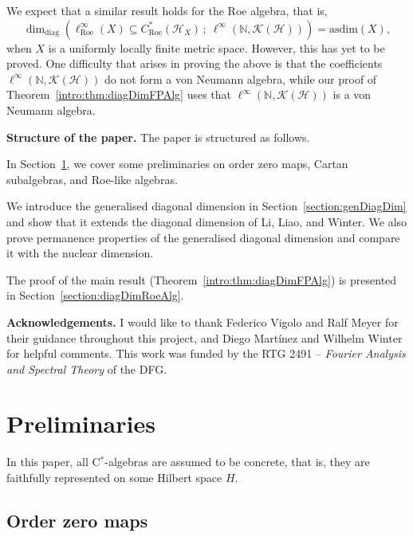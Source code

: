 \documentclass[a4paper]{amsart}
\newcommand{\myhyp}{\textnormal{-}\hskip0pt\relax}
\newcommand{\mydhyp}{\textnormal{--}\hskip0pt\relax}
\numberwithin{equation}{section}
\newcommand{\N}{\mathbb{N}}
\newcommand{\Hcal}{\mathcal{H}}
\newcommand{\Kcal}{\mathcal{K}}
\newcommand{\cstar}{C$^\ast$\myhyp{}algebra}
\newcommand{\kop}[1]{\Kcal({#1})}
\newcommand{\Croe}[1]{C^{\ast}_{\mathrm{Roe}}(#1)}
\newcommand{\CroeCartan}[1]{\ell^{\infty}_{\mathrm{Roe}}({#1})}
\newcommand{\ddimn}[3]{\dim_{\mathrm{diag}}({#1}\subseteq{#2}\, ;~{#3})}
\newcommand{\asdim}[1]{\mathrm{asdim}({#1})}
\theoremstyle{plain}
\theoremstyle{indented}
\numberwithin{equation}{section}
\theoremstyle{definition}
\theoremstyle{remark}
\theoremstyle{plain}
\theoremstyle{definition}
\begin{document}
\medskip

We expect that a similar result holds for the Roe algebra,
that is, 
\begin{equation*}
         \ddimn{\CroeCartan{X}}{\Croe{\Hcal_X}}{\ell^\infty(\N, \kop{\Hcal})} = \asdim{X},
\end{equation*}
when $X$ is a uniformly locally finite metric space.
However, this has yet to be proved.
One difficulty that arises in proving the above is that the coefficients
${\ell^\infty(\N, \kop{\Hcal})}$ do not form a von Neumann algebra,
while our proof of Theorem~\ref{intro:thm:diagDimFPAlg} uses that ${\ell^\infty(\N, \kop{\Hcal})}$ is a von Neumann algebra.




\bigskip
\noindent\textbf{Structure of the paper.}
The paper is structured as follows. 

In Section~\ref{section:prelim}, we cover some preliminaries on order zero maps, Cartan subalgebras, and Roe-like algebras.

We introduce the generalised diagonal dimension in Section~\ref{section:genDiagDim} and show that it extends the diagonal dimension of Li, Liao, and Winter. We also prove permanence properties of the generalised diagonal dimension and compare it with the nuclear dimension. 

The proof of the main result (Theorem~\ref{intro:thm:diagDimFPAlg}) is presented in Section~\ref{section:diagDimRoeAlg}.



\bigskip
\noindent\textbf{Acknowledgements.}
I would like to thank Federico Vigolo and Ralf Meyer for their guidance throughout this project, and Diego Mart\'{i}nez and Wilhelm Winter for helpful comments.
This work was funded by the RTG 2491 \mydhyp{} \emph{Fourier Analysis and Spectral Theory} of the DFG.


\tableofcontents



\section{Preliminaries} \label{section:prelim}

In this paper, all \cstar{}s are assumed to be concrete, that is, they are faithfully represented on some Hilbert space $H$. 


\subsection{Order zero maps}
\end{document}
